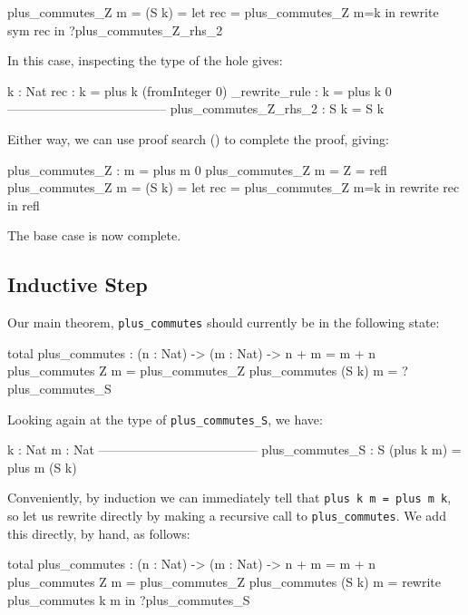 \begin{code}
plus_commutes_Z {m = (S k)} = let rec = plus_commutes_Z {m=k} in
                                  rewrite sym rec in ?plus_commutes_Z_rhs_2
\end{code}

\noindent
In this case, inspecting the type of the hole gives:

\begin{code}
  k : Nat
  rec : k = plus k (fromInteger 0)
  _rewrite_rule : k = plus k 0
--------------------------------------
plus_commutes_Z_rhs_2 : S k = S k
\end{code}

\noindent
Either way, we can use proof search (\psearch{}) to complete the proof,
giving:

\begin{code}
plus_commutes_Z : m = plus m 0
plus_commutes_Z {m = Z} = refl
plus_commutes_Z {m = (S k)} = let rec = plus_commutes_Z {m=k} in
                                  rewrite rec in refl
\end{code}

\noindent
The base case is now complete.

\subsection{Inductive Step}

Our main theorem, \texttt{plus\_commutes} should currently be in the following
state:

\begin{code}
total
plus_commutes : (n : Nat) -> (m : Nat) -> n + m = m + n
plus_commutes Z m = plus_commutes_Z
plus_commutes (S k) m = ?plus_commutes_S
\end{code}

\noindent
Looking again at the type of \texttt{plus\_commutes\_S}, we have:

\begin{code}
  k : Nat
  m : Nat
--------------------------------------
plus_commutes_S : S (plus k m) = plus m (S k)
\end{code}

\noindent
Conveniently, by induction we can immediately tell that \texttt{plus k m = plus m k},
so let us rewrite directly by making a recursive call to \texttt{plus\_commutes}.
We add this directly, by hand, as follows:

\begin{code}
total
plus_commutes : (n : Nat) -> (m : Nat) -> n + m = m + n
plus_commutes Z m = plus_commutes_Z
plus_commutes (S k) m = rewrite plus_commutes k m in ?plus_commutes_S
\end{code}

